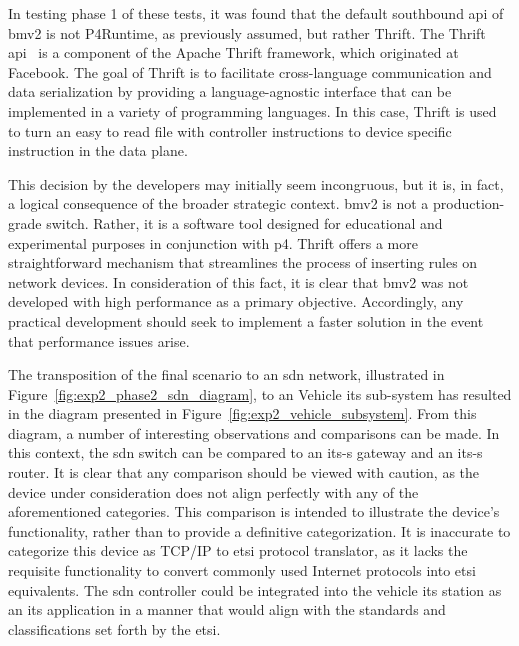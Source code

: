 In testing phase 1 of these tests, it was found that the default southbound \gls{api} of \gls{bmv2} is not P4Runtime, as previously assumed, but rather Thrift. The Thrift \gls{api}~\cite{noauthor_apache_nodate} is a component of the Apache Thrift framework, which originated at Facebook. The goal of Thrift is to facilitate cross-language communication and data serialization by providing a language-agnostic interface that can be implemented in a variety of programming languages. In this case, Thrift is used to turn an easy to read file with controller instructions to device specific instruction in the data plane.

This decision by the developers may initially seem incongruous, but it is, in fact, a logical consequence of the broader strategic context. \gls{bmv2} is not a production-grade switch. Rather, it is a software tool designed for educational and experimental purposes in conjunction with \gls{p4}. Thrift offers a more straightforward mechanism that streamlines the process of inserting rules on network devices. 
In consideration of this fact, it is clear that \gls{bmv2} was not developed with high performance as a primary objective. Accordingly, any practical development should seek to implement a faster solution in the event that performance issues arise.

The transposition of the final scenario to an \gls{sdn} network, illustrated in Figure~\ref{fig:exp2_phase2_sdn_diagram}, to an Vehicle \gls{its} sub-system has resulted in the diagram presented in Figure~\ref{fig:exp2_vehicle_subsystem}. From this diagram, a number of interesting observations and comparisons can be made. 
In this context, the \gls{sdn} switch can be compared to an \gls{its-s} gateway and an \gls{its-s} router. It is clear that any comparison should be viewed with caution, as the device under consideration does not align perfectly with any of the aforementioned categories. This comparison is intended to illustrate the device's functionality, rather than to provide a definitive categorization. It is inaccurate to categorize this device as TCP/IP to \gls{etsi} protocol translator, as it lacks the requisite functionality to convert commonly used Internet protocols into \gls{etsi} equivalents.
The \gls{sdn} controller could be integrated into the vehicle \gls{its} station as an \gls{its} application in a manner that would align with the standards and classifications set forth by the \gls{etsi}.

